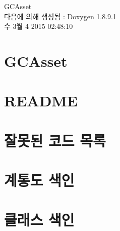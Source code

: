 \documentclass[twoside]{book}
\newcommand{\+}{\discretionary{\mbox{\scriptsize$\hookleftarrow$}}{}{}}
\newcommand{\clearemptydoublepage}{%
  \newpage{\pagestyle{empty}\cleardoublepage}%
}
\begin{document}
\hypersetup{pageanchor=false,
             bookmarks=true,
             bookmarksnumbered=true,
             pdfencoding=unicode
            }
\begin{titlepage}
\vspace*{7cm}
\begin{center}%
{\Large G\+C\+Asset }\\
\vspace*{1cm}
{\large 다음에 의해 생성됨 \+:  Doxygen 1.8.9.1}\\
\vspace*{0.5cm}
{\small 수 3월 4 2015 02:48:10}\\
\end{center}
\end{titlepage}
\clearemptydoublepage
\tableofcontents
\clearemptydoublepage
{}
\hypersetup{pageanchor=true}

\chapter{G\+C\+Asset}
\label{index}\hypertarget{index}{}
\chapter{R\+E\+A\+D\+M\+E}
\label{md__c_1_devtools_workspace__g_c_asset__g_c_asset__assets__g_c_server__r_e_a_d_m_e}
\hypertarget{md__c_1_devtools_workspace__g_c_asset__g_c_asset__assets__g_c_server__r_e_a_d_m_e}{}

\chapter{잘못된 코드 목록}
\label{deprecated}
\hypertarget{deprecated}{}

\chapter{계통도 색인}

\chapter{클래스 색인}

\end{document}
